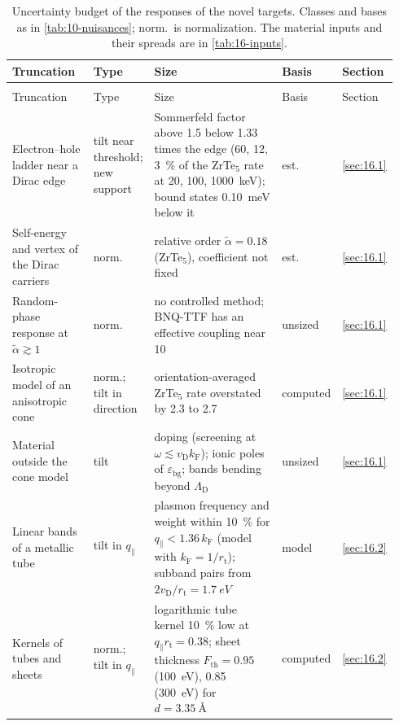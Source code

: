 {\scriptsize\setlength{\tabcolsep}{3pt}\setlength{\LTcapwidth}{\textwidth}
\begin{longtable}{@{}>{\raggedright\arraybackslash}p{0.23\linewidth}>{\raggedright\arraybackslash}p{0.11\linewidth}>{\raggedright\arraybackslash}p{0.44\linewidth}>{\raggedright\arraybackslash}p{0.08\linewidth}>{\raggedright\arraybackslash}p{0.08\linewidth}@{}}
  \caption{Uncertainty budget of the responses of the novel targets. Classes and bases as in \cref{tab:10-nuisances}; norm.\ is normalization. The material inputs and their spreads are in \cref{tab:16-inputs}.}\label{tab:16-nuisances}\\
  \toprule
  Truncation & Type & Size & Basis & Section \\
  \midrule
  \endfirsthead
  \multicolumn{5}{@{}l}{\cref{tab:16-nuisances}, continued}\\
  \toprule
  Truncation & Type & Size & Basis & Section \\
  \midrule
  \endhead
  \bottomrule
  \endlastfoot
    Electron--hole ladder near a Dirac edge & tilt near threshold; new support & Sommerfeld factor above 1.5 below 1.33 times the edge (60, 12, \SI{3}{\percent} of the ZrTe$_5$ rate at 20, 100, \SI{1000}{keV}); bound states \SI{0.10}{meV} below it & est. & \cref{sec:16.1} \\
    Self-energy and vertex of the Dirac carriers & norm. & relative order $\tilde\alpha = 0.18$ (ZrTe$_5$), coefficient not fixed & est. & \cref{sec:16.1} \\
    Random-phase response at $\tilde\alpha \gtrsim 1$ & norm. & no controlled method; BNQ-TTF has an effective coupling near 10 & unsized & \cref{sec:16.1} \\
    Isotropic model of an anisotropic cone & norm.; tilt in direction & orientation-averaged ZrTe$_5$ rate overstated by 2.3 to 2.7 & computed & \cref{sec:16.1} \\
    Material outside the cone model & tilt & doping (screening at $\omega \lesssim v_{\mathrm{D}}k_{\mathrm{F}}$); ionic poles of $\varepsilon_{\mathrm{bg}}$; bands bending beyond $\Lambda_{\mathrm{D}}$ & unsized & \cref{sec:16.1} \\
    Linear bands of a metallic tube & tilt in $q_\parallel$ & plasmon frequency and weight within \SI{10}{\percent} for $q_\parallel < 1.36\,k_{\mathrm{F}}$ (model with $k_{\mathrm{F}} = 1/r_{\mathrm{t}}$); subband pairs from $2v_{\mathrm{D}}/r_{\mathrm{t}} = \SI{1.7}{eV}$ & model & \cref{sec:16.2} \\
    Kernels of tubes and sheets & norm.; tilt in $q_\parallel$ & logarithmic tube kernel \SI{10}{\percent} low at $q_\parallel r_{\mathrm{t}} = 0.38$; sheet thickness $F_{\mathrm{th}} = 0.95$ (\SI{100}{eV}), 0.85 (\SI{300}{eV}) for $d = \SI{3.35}{\angstrom}$ & computed & \cref{sec:16.2} \\

\end{longtable}}
